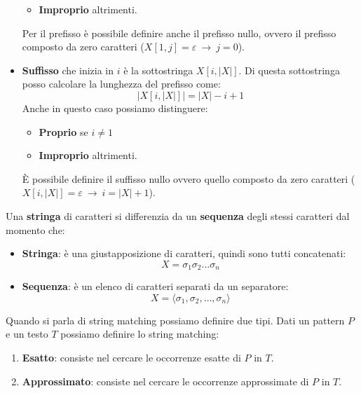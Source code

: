 \begin{definizione}
\begin{itemize}
\begin{itemize}
                  \item \textbf{Improprio} altrimenti.
              \end{itemize}
              Per il prefisso è possibile definire anche il prefisso nullo, ovvero
              il prefisso composto da zero caratteri ($X[1, j]=\varepsilon \ \to
                  \ j = 0$).
        \item \textbf{Suffisso} che inizia in $i$ è la sottostringa $X[i,|X|]$.
              Di questa sottostringa posso calcolare la lunghezza del prefisso
              come:
              \begin{equation}
                  |X[i,|X|]| = |X| - i + 1
              \end{equation}
              Anche in questo caso possiamo distinguere:
              \begin{itemize}
                  \item \textbf{Proprio} se $i \neq 1$
                  \item \textbf{Improprio} altrimenti.
              \end{itemize}
              È possibile definire il suffisso nullo ovvero quello composto da
              zero caratteri ($X[i,|X|]=\varepsilon \ \to \ i = |X| + 1$).
    \end{itemize}
\end{definizione}
\begin{nota}
    Una \textbf{stringa} di caratteri si differenzia da un \textbf{sequenza}
    degli stessi caratteri dal momento che:
    \begin{itemize}
        \item \textbf{Stringa}: è una giustapposizione di caratteri, quindi sono
              tutti concatenati:
              \begin{equation}
                  X = \sigma_1\sigma_2\dots\sigma_n
              \end{equation}
        \item \textbf{Sequenza}: è un elenco di caratteri separati da un separatore:
              \begin{equation}
                  X= \langle\sigma_1,\sigma_2,\dots,\sigma_n\rangle
              \end{equation}
    \end{itemize}
\end{nota}
Quando si parla di string matching possiamo definire due tipi. Dati un pattern
$P$ e un testo $T$ possiamo definire lo string matching:
\begin{enumerate}
    \item \textbf{Esatto}: consiste nel cercare le occorrenze esatte di $P$ in $T$.
    \item \textbf{Approssimato}: consiste nel cercare le occorrenze approssimate
          di $P$ in $T$.
\end{enumerate}
